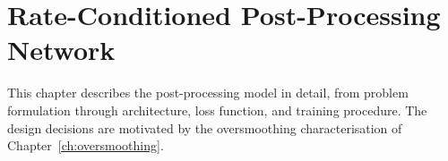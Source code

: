 \chapter{Rate-Conditioned Post-Processing Network}
\label{ch:model}

This chapter describes the post-processing model in detail, from problem
formulation through architecture, loss function, and training procedure.
The design decisions are motivated by the oversmoothing characterisation
of Chapter~\ref{ch:oversmoothing}.








